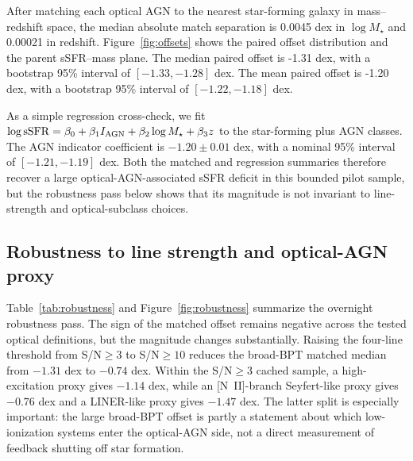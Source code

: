 \documentclass[twocolumn]{aastex631}
\begin{document}
After matching each optical AGN to the nearest star-forming galaxy in mass--redshift space, the median absolute match separation is 0.0045 dex in $\log M_\star$ and 0.00021 in redshift.  Figure~\ref{fig:offsets} shows the paired offset distribution and the parent sSFR--mass plane.  The median paired offset is -1.31 dex, with a bootstrap 95\% interval of $[-1.33,-1.28]$ dex.  The mean paired offset is -1.20 dex, with a bootstrap 95\% interval of $[-1.22,-1.18]$ dex.

As a simple regression cross-check, we fit $\log{\rm sSFR} = \beta_0 + \beta_1 I_{\rm AGN} + \beta_2\log M_\star + \beta_3 z$ to the star-forming plus AGN classes.  The AGN indicator coefficient is $-1.20\pm0.01$ dex, with a nominal 95\% interval of $[-1.21,-1.19]$ dex.  Both the matched and regression summaries therefore recover a large optical-AGN-associated sSFR deficit in this bounded pilot sample, but the robustness pass below shows that its magnitude is not invariant to line-strength and optical-subclass choices.

\subsection{Robustness to line strength and optical-AGN proxy}\label{sec:robustness}
Table~\ref{tab:robustness} and Figure~\ref{fig:robustness} summarize the overnight robustness pass.  The sign of the matched offset remains negative across the tested optical definitions, but the magnitude changes substantially.  Raising the four-line threshold from S/N$\geq3$ to S/N$\geq10$ reduces the broad-BPT matched median from $-1.31$ dex to $-0.74$ dex.  Within the S/N$\geq3$ cached sample, a high-excitation proxy gives $-1.14$ dex, while an [N~II]-branch Seyfert-like proxy gives $-0.76$ dex and a LINER-like proxy gives $-1.47$ dex.  The latter split is especially important: the large broad-BPT offset is partly a statement about which low-ionization systems enter the optical-AGN side, not a direct measurement of feedback shutting off star formation.
\end{document}
